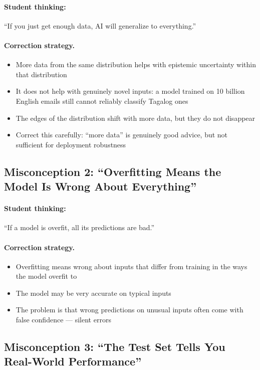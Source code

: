 \paragraph{Student thinking:} ``If you just get enough data, AI will generalize to everything.''

\paragraph{Correction strategy.}
\begin{itemize}
    \item More data from the same distribution helps with epistemic uncertainty within that distribution
    \item It does not help with genuinely novel inputs: a model trained on 10 billion English emails still cannot reliably classify Tagalog ones
    \item The edges of the distribution shift with more data, but they do not disappear
    \item Correct this carefully: ``more data'' is genuinely good advice, but not sufficient for deployment robustness
\end{itemize}

\subsection{Misconception 2: ``Overfitting Means the Model Is Wrong About Everything''}

\paragraph{Student thinking:} ``If a model is overfit, all its predictions are bad.''

\paragraph{Correction strategy.}
\begin{itemize}
    \item Overfitting means wrong about inputs that differ from training in the ways the model overfit to
    \item The model may be very accurate on typical inputs
    \item The problem is that wrong predictions on unusual inputs often come with false confidence --- silent errors
\end{itemize}

\subsection{Misconception 3: ``The Test Set Tells You Real-World Performance''}


